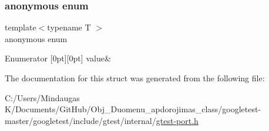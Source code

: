 \subsubsection{\texorpdfstring{anonymous enum}{anonymous enum}}
{\footnotesize\ttfamily template$<$typename T $>$ \\
anonymous enum}

\begin{DoxyEnumFields}{Enumerator}
[0pt][0pt]{}\mbox{\label{structtesting_1_1internal_1_1_static_assert_type_eq_helper_3_01_t_00_01_t_01_4_a8fe75233c50d03ea2f92b01caa005137a981d533bd53f37d60956f9570465f4e7}} 
value&\\
\hline

\end{DoxyEnumFields}


The documentation for this struct was generated from the following file\+:\begin{DoxyCompactItemize}
\item 
C\+:/\+Users/\+Mindaugas K/\+Documents/\+Git\+Hub/\+Obj\+\_\+\+Duomenu\+\_\+apdorojimas\+\_\+class/googletest-\/master/googletest/include/gtest/internal/\mbox{\hyperlink{googletest-master_2googletest_2include_2gtest_2internal_2gtest-port_8h}{gtest-\/port.\+h}}\end{DoxyCompactItemize}
